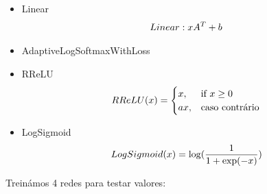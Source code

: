 \documentclass[10pt]{article}
\begin{document}
\begin{itemize}
  \item Linear
  \vspace{1cm}
  \begin{equation}
    \vspace{1cm}
    Linear : xA^T + b
  \end{equation}
  \item AdaptiveLogSoftmaxWithLoss
  \vspace{1cm}
  \item RReLU
  \begin{equation}
    \vspace{1cm}
    RReLU(x) =
      \begin{cases}
            x, & \mbox{if } x \geq \mbox{0} \\
            ax, & \mbox{caso contrário}
      \end{cases}
  \end{equation}
  \item LogSigmoid
  \begin{equation}
    \vspace{1cm}
    LogSigmoid(x) =  \log(\frac{1}{1+\exp(-x)})
  \end{equation}
\end{itemize}
\vspace{1cm}
Treinámos 4 redes para testar valores:  
\vspace{1cm}
\end{document}
